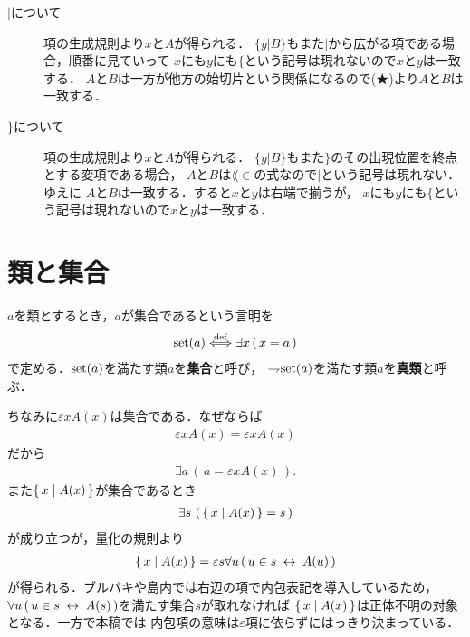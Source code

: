 \begin{description}
		\item[$|$について]
			項の生成規則より$x$と$A$が得られる．
			$\{y|B\}$もまた$|$から広がる項である場合，順番に見ていって
			$x$にも$y$にも$\{$という記号は現れないので$x$と$y$は一致する．
			$A$と$B$は一方が他方の始切片という関係になるので(★)より$A$と$B$は一致する．
			
		\item[$\}$について]
			項の生成規則より$x$と$A$が得られる．
			$\{y|B\}$もまた$\}$のその出現位置を終点とする変項である場合，
			$A$と$B$は$\lang{\in}$の式なので$|$という記号は現れない．ゆえに
			$A$と$B$は一致する．すると$x$と$y$は右端で揃うが，
			$x$にも$y$にも$\{$という記号は現れないので$x$と$y$は一致する．
	\end{description}
	
\section{類と集合}
	\begin{screen}
		\begin{dfn}[類と集合]
			$a$を類とするとき，$a$が集合であるという言明を
			\begin{align}
				\operatorname*{set} (a) \overset{\mathrm{def}}{\Longleftrightarrow} \exists x\, (\, x = a\, )
			\end{align}
			で定める．$\operatorname*{set} (a)$を満たす類$a$を{\bf 集合}と呼び，
			$\rightharpoondown\hspace{-0.25em} \operatorname*{set} (a)$を満たす類$a$を{\bf 真類}と呼ぶ．
		\end{dfn}
	\end{screen}
	
	ちなみに$\varepsilon x A(x)$は集合である．なぜならば
	\begin{align}
		\varepsilon x A(x) = \varepsilon x A(x)
	\end{align}
	だから
	\begin{align}
		\exists a\, \left(\, a = \varepsilon x A(x)\, \right).
	\end{align}
	また$\left\{\, x \mid A(x)\, \right\}$が集合であるとき
	\begin{align}
		\exists s\, \left(\, \left\{\, x \mid A(x)\, \right\} = s\, \right)
	\end{align}
	が成り立つが，量化の規則より
	\begin{align}
		\left\{\, x \mid A(x)\, \right\} = \varepsilon s \forall u\, (\, u \in s \hspace{0.25em}\leftrightarrow\hspace{0.25em} A(u)\, )
	\end{align}
	が得られる．ブルバキや島内では右辺の項で内包表記を導入しているため，
	$\forall u\, (\, u \in s \hspace{0.25em}\leftrightarrow\hspace{0.25em} A(s)\, )$を満たす集合$s$が取れなければ
	$\left\{\, x \mid A(x)\, \right\}$は正体不明の対象となる．一方で本稿では
	内包項の意味は$\varepsilon$項に依らずにはっきり決まっている．
	
